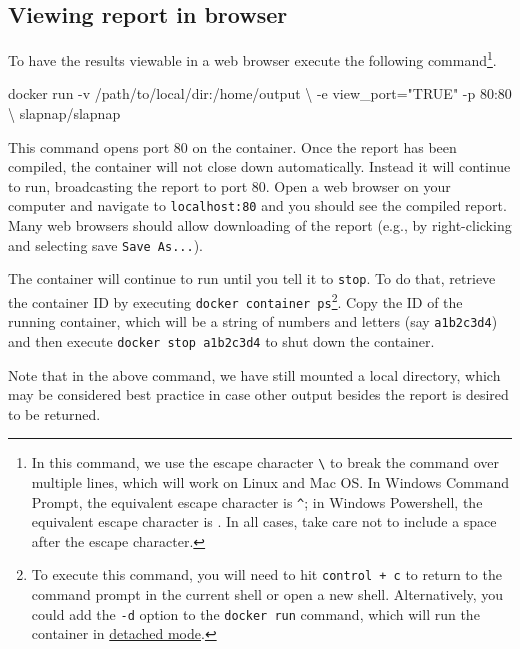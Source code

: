 \documentclass[]{article}
\newenvironment{Shaded}{\begin{snugshade}}{\end{snugshade}}
\newcommand{\StringTok}[1]{\textcolor[rgb]{0.31,0.60,0.02}{#1}}
\newcommand{\ExtensionTok}[1]{#1}
\newcommand{\NormalTok}[1]{#1}
\begin{document}
\subsection{Viewing report in browser}\label{sec:webbrowse}

To have the results viewable in a web browser execute the following
command\footnote{In this command, we use the escape character
  \texttt{\textbackslash{}} to break the command over multiple lines,
  which will work on Linux and Mac OS. In Windows Command Prompt, the
  equivalent escape character is \texttt{\^{}}; in Windows Powershell,
  the equivalent escape character is \texttt{\textasciigrave{}}. In all
  cases, take care not to include a space after the escape character.}.

\begin{Shaded}
\begin{Highlighting}[]
\ExtensionTok{docker}\NormalTok{ run -v /path/to/local/dir:/home/output \textbackslash{}}
\NormalTok{           -e view_port=}\StringTok{"TRUE"}\NormalTok{ -p 80:80 \textbackslash{}}
\NormalTok{           slapnap/slapnap}
\end{Highlighting}
\end{Shaded}

This command opens port 80 on the container. Once the report has been
compiled, the container will not close down automatically. Instead it
will continue to run, broadcasting the report to port 80. Open a web
browser on your computer and navigate to \texttt{localhost:80} and you
should see the compiled report. Many web browsers should allow
downloading of the report (e.g., by right-clicking and selecting save
\texttt{Save\ As...}).

The container will continue to run until you tell it to \texttt{stop}.
To do that, retrieve the container ID by executing
\texttt{docker\ container\ ps}\footnote{To execute this command, you
  will need to hit \texttt{control\ +\ c} to return to the command
  prompt in the current shell or open a new shell. Alternatively, you
  could add the \texttt{-d} option to the \texttt{docker\ run} command,
  which will run the container in
  \href{https://docs.docker.com/engine/reference/run/\#detached-vs-foreground}{detached
  mode}.}. Copy the ID of the running container, which will be a string
of numbers and letters (say \texttt{a1b2c3d4}) and then execute
\texttt{docker\ stop\ a1b2c3d4} to shut down the container.

Note that in the above command, we have still mounted a local directory,
which may be considered best practice in case other output besides the
report is desired to be returned.
\end{document}
